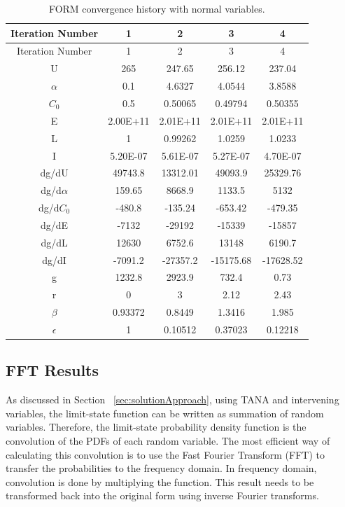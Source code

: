 \documentclass[paper=a4, fontsize=12pt]{scrartcl} %
\begin{document}
%
%
\begin{table}[H]
\centering
\begin{tabular}{ c || c | c | c | c }
	Iteration Number & 1 & 2 & 3 & 4 \\
	\hline
	Iteration Number & 1 & 2 & 3 & 4 \\
	U & 265 & 247.65 & 256.12 & 237.04 \\
	$\alpha$ & 0.1 & 4.6327 & 4.0544 & 3.8588 \\
	$C_0$ & 0.5 & 0.50065 & 0.49794 & 0.50355 \\
	E & 2.00E+11 & 2.01E+11 & 2.01E+11 & 2.01E+11 \\
	L & 1 & 0.99262 & 1.0259 & 1.0233 \\
	I & 5.20E-07 & 5.61E-07 & 5.27E-07 & 4.70E-07 \\
	dg/dU & 49743.8 & 13312.01 & 49093.9 & 25329.76 \\
	dg/d$\alpha$ & 159.65 & 8668.9 & 1133.5 & 5132 \\
	dg/d$C_0$ & -480.8 & -135.24 & -653.42 & -479.35 \\
	dg/dE & -7132 & -29192 & -15339 & -15857 \\
	dg/dL & 12630 & 6752.6 & 13148 & 6190.7 \\
	dg/dI & -7091.2 & -27357.2 & -15175.68 & -17628.52 \\
	g & 1232.8 & 2923.9 & 732.4 & 0.73 \\
	r & 0 & 3 & 2.12 & 2.43 \\
	$\beta$ & 0.93372 & 0.8449 & 1.3416 & 1.985 \\
	$\epsilon$ & 1 & 0.10512 & 0.37023 & 0.12218 \\
	\hline
\end{tabular}
\caption{FORM convergence history with normal variables.}
\label{table:resultsFORM_Normal}
\end{table}
%
\subsection{FFT Results}
As discussed in Section ~\ref{sec:solutionApproach}, using TANA and intervening variables, the limit-state function can be written as summation of random variables. Therefore, the limit-state probability density function is the convolution of the PDFs of each random variable. The most efficient way of calculating this convolution is to use the Fast Fourier Transform (FFT) to transfer the probabilities to the frequency domain. In frequency domain, convolution is done by multiplying the function. This result needs to be transformed back into the original form using inverse Fourier transforms.\\
\end{document}
